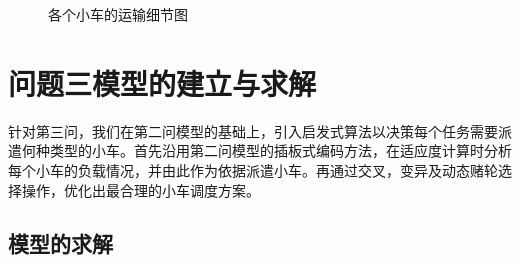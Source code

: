 \documentclass{whutmod}
\begin{document}
\begin{figure}[H]	
	\centering
	\caption{各个小车的运输细节图}
	\label{fisg}
\end{figure}

    \section{问题三模型的建立与求解}
  针对第三问，我们在第二问模型的基础上，引入启发式算法以决策每个任务需要派遣何种类型的小车。首先沿用第二问模型的插板式编码方法，在适应度计算时分析每个小车的负载情况，并由此作为依据派遣小车。再通过交叉，变异及动态赌轮选择操作，优化出最合理的小车调度方案。  
    \subsection{模型的求解}
\end{document}
